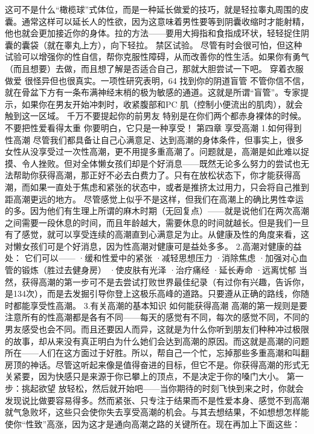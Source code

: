 \documentclass[12pt,UTF8]{ctexbook}
\begin{document}
这可不是什么“橄榄球”式体位，而是一种延长做爱的技巧，就是轻拉睾丸周围的皮囊。通常这样可以延长人的性欲，因为这意味着男性要等到阴囊收缩时才能射精，他也就会更加接近你的身体。拉的方法——要用大拇指和食指成环状，轻轻捉住阴囊的囊袋（就在睾丸上方），向下轻拉。
禁区试验。
尽管有时会很可怕，但这种试验可以增强你的性自信，帮你克服性障碍，从而改善你的性生活。如果你有勇气（而且想要）去做，而且想了解是否适合自己，那就大胆尝试一下吧。
穿着衣服做爱
很怪异但也很真实。一项性研究表明，64%
找到你的阴道盲管
不管你信不信，就在骨盆下方有一条布满神经末梢的极为敏感的通道。这就是所谓“盲管”。专家提示，如果你在男友开始冲刺时，收紧腹部和PC 肌（控制小便流出的肌肉），就会触到这一区域。
千万不要提起你的前男友
特别是在你们两个都赤身裸体的时候。
不要把性爱看得太重
你要明白，它只是一种享受！
第四章 享受高潮
1.如何得到性高潮
尽管我们都具备让自己心满意足、达到高潮的身体条件，但事实上，很多女性从没享受过一次性高潮，更不用提多重高潮了。问题就是，高潮是如此难以捉摸、令人挫败。但对全体懒女孩们却是个好消息——既然无论多么努力的尝试也无法帮助你获得高潮，那正好不必去白费力了。只有在放松状态下，你才能获得高潮，而如果一直处于焦虑和紧张的状态中，或者是推挤太过用力，只会将自己推到距高潮更远的地方。
尽管感觉上似乎不是这样，但我们在高潮上的确比男性幸运的多。因为他们有生理上所谓的麻木时期（无回复点）——就是说他们在两次高潮之间需要一段休息的时间，而且年龄越大，需要休息的时间就越长。但是我们一旦有了感觉，就可以享受连续的高潮直到心满意足为止。从健康及性的角度来看，这对懒女孩们可是个好消息，因为性高潮对健康可是益处多多。
2.高潮对健康的益处：
它们可以——
·缓和性爱中的紧张
·减轻思想压力
·消除焦虑
·加强对心血管的锻炼（胜过去健身房）
·使皮肤有光泽
·治疗痛经
·延长寿命
·远离忧郁
当然，获得高潮的第一步可不是去尝试打败世界最佳纪录（有过你有兴趣，告诉你，是134次），而是去发掘引导你登上这极乐高峰的道路。只要遵从正确的路线，你随时都能享受性高潮。
3.有关高潮的基本知识
如何能获得高潮
高潮的第一规则是要注意所有的性高潮都是各有不同——每天的感觉有不同，每次的感觉不同，不同的男友感受也会不同。而且还要因人而异，这就是为什么你听到朋友们种种冲过极限的故事，却从来没有真正明白为什么她们会达到高潮的原因。而这就是高潮的问题所在——人们在这方面过于好胜。所以，帮自己一个忙，忘掉那些多重高潮和叫翻房顶的神话。尽管这听起来像是值得奋进的目标，但它不是。你获得高潮的形式无关紧要，因为快感只是来源于你已攀上的顶点，不是决定于你的嗓门大小。
第一步：挑起欲望
放轻松，然后就开始吧——当你期待的时刻飞快到来之时，你就会发现说比做要容易得多。然而紧张、只专注于结果而不是性爱本身、感觉不到高潮就气急败坏，这些只会使你失去享受高潮的机会。与其去想结果，不如想想怎样能使你“性致”高涨，因为这才是通向高潮之路的关键所在。现在再加上下面这些：
\end{document}
